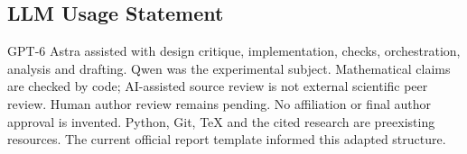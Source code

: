 \documentclass[11pt]{article}
\begin{document}
\subsection*{LLM Usage Statement}
GPT-6 Astra assisted with design critique, implementation, checks, orchestration,
analysis and drafting. Qwen was the experimental subject. Mathematical claims
are checked by code; AI-assisted source review is not external scientific peer
review. Human author review remains pending. No affiliation or final author
approval is invented. Python, Git, TeX and the cited research are preexisting
resources. The current official report template informed this adapted structure.
\end{document}
